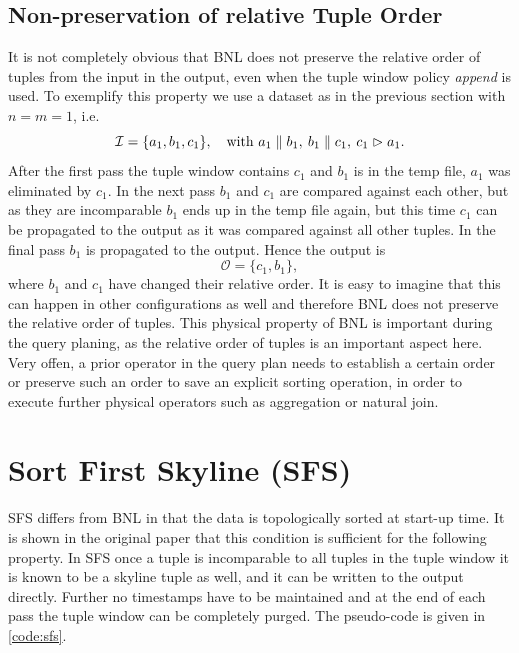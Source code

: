 \subsection{Non-preservation of relative Tuple Order}
\label{sec:bnl-tuple-order}
It is not completely obvious that BNL does not preserve the relative
order of tuples from the input in the output, even when the tuple
window policy \emph{append} is used.  To exemplify this property
we use a dataset as in the previous section with $n=m=1$, i.e.
\[
\mathcal{I} = \{a_1, b_1, c_1\},\quad\text{with}\ a_1 \parallel b_1,\: b_1 \parallel c_1,\: c_1 \vartriangleright a_1.
\]
After the first pass the tuple window contains $c_1$ and $b_1$ is in
the temp file, $a_1$ was eliminated by $c_1$. In the next pass $b_1$
and $c_1$ are compared against each other, but as they are incomparable
$b_1$ ends up in the temp file again, but this time $c_1$ can be
propagated to the output as it was compared against all other tuples.
In the final pass $b_1$ is propagated to the output.  Hence the output
is
\[
\mathcal{O} = \{c_1, b_1\}, 
\]
where $b_1$ and $c_1$ have changed their relative order.  It is easy
to imagine that this can happen in other configurations as well and
therefore BNL does not preserve the relative order of tuples.  This
physical property of BNL is important during the query planing, as the
relative order of tuples is an important aspect here. Very offen, a prior
operator in the query plan needs to establish a certain order or preserve such an order
to save an explicit sorting operation, in order to execute further 
physical operators such as aggregation or natural join.

\section{Sort First Skyline (SFS)}
SFS \citep{Chomicki2003} differs from BNL in that the data is
topologically sorted at start-up time.  It is shown in the original
paper that this condition is sufficient for the following property.  In
SFS once a tuple is incomparable to all tuples in the tuple window it
is known to be a skyline tuple as well, and it can be written to the
output directly.  Further no timestamps have to be maintained and at
the end of each pass the tuple window can be completely purged.
The pseudo-code is given in \autoref{code:sfs}.


